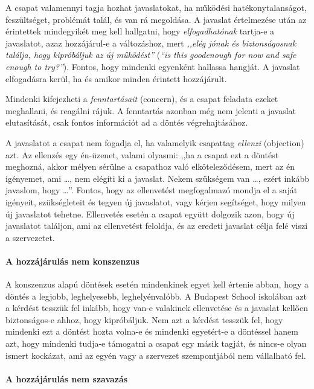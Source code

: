 A csapat valamennyi tagja hozhat javaslatokat, ha működési hatékonytalanságot, feszültséget, problémát talál, és van rá megoldása. A javaslat értelmezése után az érintettek mindegyikét meg kell hallgatni, hogy \emph{elfogadhatónak} tartja-e a javaslatot, azaz hozzájárul-e a változáshoz, mert \emph{,,elég jónak és biztonságosnak találja, hogy
  kipróbáljuk az új működést''} (\emph{``is this good\break enough for now and
  safe enough to try?''}). Fontos, hogy mindenki egyenként hallassa hangját. A javaslat elfogadásra kerül, ha és amikor minden érintett hozzájárult.

Mindenki kifejezheti a \emph{fenntartásait} (concern), és a csapat feladata ezeket meghallani, és reagálni rájuk. A fenntartás azonban még nem jelenti a javaslat elutasítását, csak fontos információt ad a döntés végrehajtásához.

A javaslatot a csapat nem fogadja el, ha valamelyik csapattag \emph{ellenzi} (objection) azt. Az ellenzés egy én-üzenet, valami olyasmi: ,,ha a csapat ezt a döntést meghozná, akkor mélyen sérülne a csapathoz való elköteleződésem, mert az én igényemet, ami \ldots{}, nem elégíti ki a javaslat. Nekem szükségem van \ldots{}, ezért inkább javaslom, hogy \ldots{}''. Fontos, hogy az ellenvetést megfogalmazó mondja el a saját igényeit, szükségleteit és tegyen új javaslatot, vagy kérjen segítséget, hogy milyen új javaslatot tehetne. Ellenvetés esetén a csapat együtt dolgozik azon, hogy új javaslatot találjon, ami az ellenvetést feloldja, és az eredeti javaslat célja felé viszi a szervezetet.

\paragraph{A hozzájárulás nem konszenzus}

A konszenzus alapú döntések esetén mindenkinek egyet kell értenie abban, hogy a döntés a legjobb, leghelyesebb, leghelyénvalóbb. A Budapest School iskolában azt a kérdést tesszük fel inkább, hogy van-e valakinek ellenvetése és a javaslat kellően biztonságos-e ahhoz, hogy kipróbáljuk. Nem azt a kérdést tesszük fel, hogy mindenki ezt a döntést hozta volna-e és mindenki egyetért-e a döntéssel hanem azt, hogy mindenki tudja-e támogatni a csapat egy másik tagját, és nincs-e olyan ismert kockázat, ami az egyén vagy a szervezet szempontjából nem vállalható fel.

\paragraph{A hozzájárulás nem szavazás}

